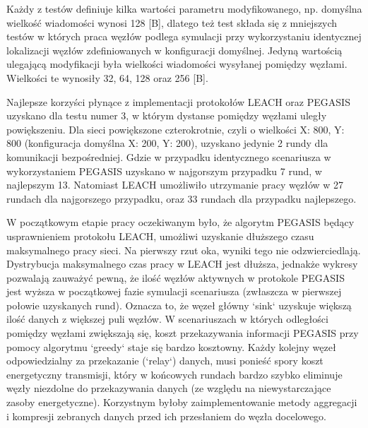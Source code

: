 \documentclass[a4paper,12pt,twoside,openany]{report}
\begin{document}
\par
Każdy z testów definiuje kilka wartości parametru modyfikowanego, np. domyślna wielkość wiadomości wynosi 128 [B], dlatego też test składa się z mniejszych testów w których
praca węzłów podlega symulacji przy wykorzystaniu identycznej lokalizacji węzłów zdefiniowanych w konfiguracji domyślnej. Jedyną wartością ulegającą modyfikacji była
wielkości wiadomości wysyłanej pomiędzy węzłami. Wielkości te wynosiły 32, 64, 128 oraz 256 [B].
\par
Najlepsze korzyści płynące z implementacji protokołów LEACH oraz PEGASIS uzyskano dla testu numer 3, w którym dystanse pomiędzy węzłami uległy powiększeniu.
Dla sieci powiększone czterokrotnie, czyli o wielkości X: 800, Y: 800 (konfiguracja domyślna X: 200, Y: 200), uzyskano jedynie 2 rundy dla komunikacji bezpośredniej.
Gdzie w przypadku identycznego scenariusza w wykorzystaniem PEGASIS uzyskano w najgorszym przypadku 7 rund, w najlepszym 13. Natomiast LEACH umożliwiło utrzymanie pracy węzłów 
w 27 rundach dla najgorszego przypadku, oraz 33 rundach dla przypadku najlepszego.
\par
W początkowym etapie pracy oczekiwanym było, że algorytm PEGASIS będący usprawnieniem protokołu LEACH, umożliwi uzyskanie dłuższego czasu maksymalnego pracy sieci.
Na pierwszy rzut oka, wyniki tego nie odzwierciedlają. Dystrybucja maksymalnego czas pracy w LEACH jest dłuższa, jednakże wykresy pozwalają zauważyć pewną, że ilość węzłów aktywnych
w protokole PEGASIS jest wyższa w początkowej fazie symulacji scenariusza (zwłaszcza w pierwszej połowie uzyskanych rund). Oznacza to, że węzeł główny `sink` uzyskuje większą ilość
danych z większej puli węzłów.
W scenariuszach w których odległości pomiędzy węzłami zwiększają się, koszt przekazywania informacji PEGASIS przy pomocy algorytmu `greedy` staje się bardzo kosztowny. Każdy kolejny węzeł
odpowiedzialny za przekazanie (`relay`) danych, musi ponieść spory koszt energetyczny transmisji, który w końcowych rundach bardzo szybko eliminuje węzły niezdolne do przekazywania danych
(ze względu na niewystarczające zasoby energetyczne). Korzystnym byłoby zaimplementowanie metody aggregacji i kompresji zebranych danych przed ich przesłaniem do węzła docelowego.
\end{document}
